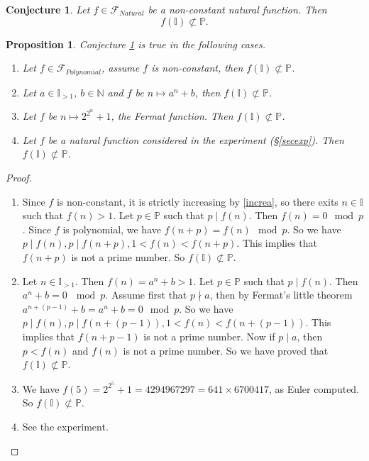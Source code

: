 \documentclass{alggeom}
\newtheorem{prop}[theo]{Proposition}
\newtheorem{conj}[theo]{Conjecture}
\newcommand{\N}{\mathbb{N}}
\newcommand{\I}{\mathbb{I}}
\newcommand{\pp}{\mathbb{P}}
\begin{document}
\begin{conj} \label{conj}
 Let $f \in \mathscr{F}_{Natural} $ be a non-constant natural function. 
Then \[f( \I) \not \subset \pp.\]
\end{conj}

\begin{prop} \label{evidence} Conjecture  \ref{conj} is true in the following cases.

\begin{enumerate}
\item Let $f \in \mathscr{F} _{Polynomial}$, assume $f$ is non-constant, then $f (\I) \not \subset \pp$.
\item Let $a \in \I _{>1}$, $b \in \N$ and $f  $ be $n \mapsto a^n +b$, then $f (\I ) \not \subset \pp$.
\item Let $f$ be $n \mapsto 2^{2^n}+1$, the Fermat function. Then $f (\I) \not \subset \pp$.
\item Let $f$ be a natural function considered in the experiment (§\ref{secexp}). Then $f (\I) \not \subset \pp$.
\end{enumerate}
\end{prop}

\begin{proof} \begin{enumerate} \item Since $f$ is non-constant, it is strictly increasing by \ref{increa}, so there exits $n \in \I$ such that $f(n) >1$. Let $p \in \pp$ such that $p \mid f(n)$. Then $f(n) =0 \mod p$. Since $f$ is polynomial, we have $f(n+p) = f(n) \mod p.$ So we have $ p \mid f(n) , p \mid f(n+p) ,1< f(n) < f(n+p) .$ This implies that $f(n+p)$ is not a prime number. So $f(\I) \not \subset \pp$.
\item Let $n\in \I _{>1}$. Then $f(n)=a^n +b >1$.  Let $p\in \pp$ such that $p \mid f(n)$. Then $a^n+b =0 ~ \mod p. $ Assume first that $p \nmid a$, then by Fermat's little theorem $a^{n+ (p-1)} +b = a^n +b =0 \mod p.$ So we have $p \mid f(n),  p \mid f (n+(p-1)) ,  1 < f(n) < f(n+(p-1)) .$ This implies that $f (n+p-1) $ is not a prime number. Now if $p \mid a$, then $p < f(n)$ and $f(n)$ is not a prime number. So we have proved that $f(\I) \not \subset \pp$.
\item  We have $f(5)=2^{2^5}+1 =4294967297=641 \times 6700417$, as Euler \cite{euler1, euler2} computed. So $f(\I) \not \subset \pp$.
\item See the experiment.
\end{enumerate}
\end{proof}
\end{document}
